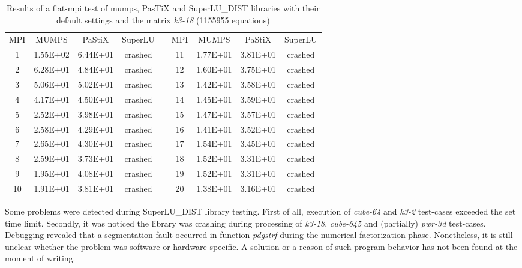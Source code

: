 \begin{table}[h!]
\centering
\begin{tabular}{|c|c|c|c|l|c|c|c|c|}
\cline{1-4} \cline{6-9}
MPI & MUMPS    & PaStiX   & SuperLU &  & MPI & MUMPS    & PaStiX   & SuperLU \\ \cline{1-4} \cline{6-9} 
1   & 1.55E+02 & 6.44E+01 & crashed &  & 11  & 1.77E+01 & 3.81E+01 & crashed \\ \cline{1-4} \cline{6-9} 
2   & 6.28E+01 & 4.84E+01 & crashed &  & 12  & 1.60E+01 & 3.75E+01 & crashed \\ \cline{1-4} \cline{6-9} 
3   & 5.06E+01 & 5.02E+01 & crashed &  & 13  & 1.42E+01 & 3.58E+01 & crashed \\ \cline{1-4} \cline{6-9} 
4   & 4.17E+01 & 4.50E+01 & crashed &  & 14  & 1.45E+01 & 3.59E+01 & crashed \\ \cline{1-4} \cline{6-9} 
5   & 2.52E+01 & 3.98E+01 & crashed &  & 15  & 1.47E+01 & 3.57E+01 & crashed \\ \cline{1-4} \cline{6-9} 
6   & 2.58E+01 & 4.29E+01 & crashed &  & 16  & 1.41E+01 & 3.52E+01 & crashed \\ \cline{1-4} \cline{6-9} 
7   & 2.65E+01 & 4.30E+01 & crashed &  & 17  & 1.54E+01 & 3.45E+01 & crashed \\ \cline{1-4} \cline{6-9} 
8   & 2.59E+01 & 3.73E+01 & crashed &  & 18  & 1.52E+01 & 3.31E+01 & crashed \\ \cline{1-4} \cline{6-9} 
9   & 1.95E+01 & 4.08E+01 & crashed &  & 19  & 1.52E+01 & 3.31E+01 & crashed \\ \cline{1-4} \cline{6-9} 
10  & 1.91E+01 & 3.81E+01 & crashed &  & 20  & 1.38E+01 & 3.16E+01 & crashed \\ \cline{1-4} \cline{6-9} 
\end{tabular}
\caption{Results of a flat-\gls{mpi} test of \gls{mumps}, PasTiX and SuperLU\_DIST libraries with their default settings and the matrix \textit{k3-18} (1155955 equations)}
\label{table:lc-k3-18-result}
\end{table}



Some problems were detected during  SuperLU\_DIST library testing. First of all, execution of \textit{cube-64} and \textit{k3-2} test-cases exceeded the set time limit. Secondly, it was noticed the library was crashing during processing of \textit{k3-18}, \textit{cube-645} and (partially) \textit{pwr-3d} test-cases. Debugging revealed that a segmentation fault occurred in function \textit{pdgstrf}  during the numerical factorization phase. Nonetheless, it is still unclear whether the problem was software or hardware specific. A solution or a reason of such program behavior has not been found at the moment of writing.\\


